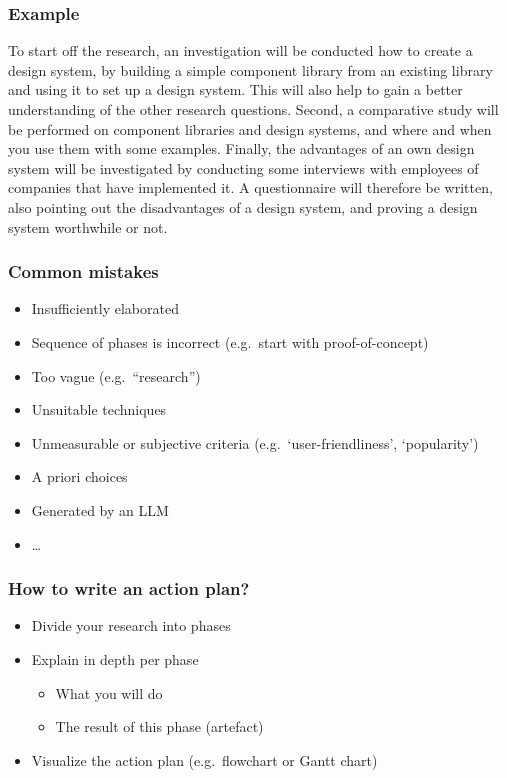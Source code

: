 \documentclass[aspectratio=169]{beamer}
\begin{document}
\begin{frame}
  \frametitle{Example}
  \small
  To start off the research, an investigation will be conducted how to create a design system, by building a simple component library from an existing library and using it to set up a design system. This will also help to gain a better understanding of the other research questions. Second, a comparative study will be performed on component libraries and design systems, and where and when you use them with some examples. Finally, the advantages of an own design system will be investigated by conducting some interviews with employees of companies that have implemented it. A questionnaire will therefore be written, also pointing out the disadvantages of a design system, and proving a design system worthwhile or not.

\end{frame}

\begin{frame}
  \frametitle{Common mistakes}

  \begin{itemize}
    \item Insufficiently elaborated
    \item Sequence of phases is incorrect (e.g.\ start with proof-of-concept)
    \item Too vague (e.g.\ ``research'')
    \item Unsuitable techniques
    \item Unmeasurable or subjective criteria (e.g.\ `user-friendliness', `popularity')
    \item A priori choices
    \item Generated by an LLM
    \item \ldots
  \end{itemize}

\end{frame}


\begin{frame}
  \frametitle{How to write an action plan?}

  \begin{itemize}
    \item Divide your research into phases
    \item Explain in depth per phase
          \begin{itemize}
            \item What you will do
            \item The result of this phase (artefact)
          \end{itemize}
    \item Visualize the action plan (e.g.\ flowchart or Gantt chart)
  \end{itemize}
\end{frame}
\end{document}
